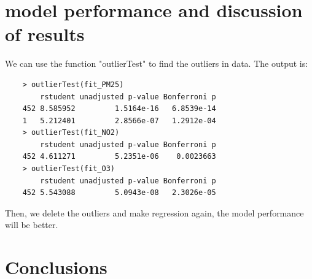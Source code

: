 \documentclass[a4paper,12pt,reqno]{report}
\begin{document}
\section{model performance and discussion of results}
\label{sec:model performance and discussion of results}
We can use the function "outlierTest" to find the outliers in data. The output is:
\begin{lstlisting}
    > outlierTest(fit_PM25)
        rstudent unadjusted p-value Bonferroni p
    452 8.585952         1.5164e-16   6.8539e-14
    1   5.212401         2.8566e-07   1.2912e-04
    > outlierTest(fit_NO2)
        rstudent unadjusted p-value Bonferroni p
    452 4.611271         5.2351e-06    0.0023663
    > outlierTest(fit_O3)
        rstudent unadjusted p-value Bonferroni p
    452 5.543088         5.0943e-08   2.3026e-05
\end{lstlisting}
Then, we delete the outliers and make regression again, the model performance will be better.


\section{Conclusions}
    
\newpage


\end{document}
